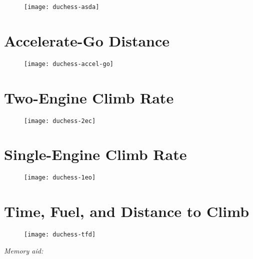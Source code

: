 {\begin{figure}[H]
\begin{center}
\texttt{[image: duchess-asda]}
\end{center}
\end{figure}

\section{Accelerate-Go Distance}

\begin{figure}[H]
\begin{center}
\texttt{[image: duchess-accel-go]}
\end{center}
\end{figure}

\newpage

\section{Two-Engine Climb Rate}

\begin{figure}[H]
\begin{center}
\texttt{[image: duchess-2ec]}
\end{center}
\end{figure}


\section{Single-Engine Climb Rate}

\begin{figure}[H]
\begin{center}
\texttt{[image: duchess-1eo]}
\end{center}
\end{figure}

\section{Time, Fuel, and Distance to Climb}

\begin{figure}[H]
\begin{center}
\texttt{[image: duchess-tfd]}
\end{center}
\end{figure}

\emph{Memory aid:}

}

